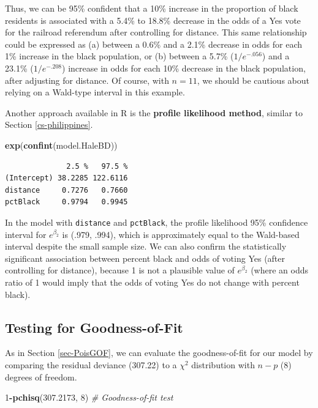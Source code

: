 \documentclass[
]{krantz}
\newenvironment{Shaded}{\begin{snugshade}}{\end{snugshade}}
\newcommand{\CommentTok}[1]{\textcolor[rgb]{0.37,0.37,0.37}{\textit{#1}}}
\newcommand{\DecValTok}[1]{\textcolor[rgb]{0.06,0.06,0.06}{#1}}
\newcommand{\FloatTok}[1]{\textcolor[rgb]{0.06,0.06,0.06}{#1}}
\newcommand{\KeywordTok}[1]{\textcolor[rgb]{0.27,0.27,0.27}{\textbf{#1}}}
\newcommand{\NormalTok}[1]{#1}
\newcommand{\OperatorTok}[1]{\textcolor[rgb]{0.43,0.43,0.43}{\textbf{#1}}}
\begin{document}
Thus, we can be 95\% confident that a 10\% increase in the proportion of black residents is associated with a 5.4\% to 18.8\% decrease in the odds of a Yes vote for the railroad referendum after controlling for distance. This same relationship could be expressed as (a) between a 0.6\% and a 2.1\% decrease in odds for each 1\% increase in the black population, or (b) between a 5.7\% (\(1/e^{-.056}\)) and a 23.1\% (\(1/e^{-.208}\)) increase in odds for each 10\% decrease in the black population, after adjusting for distance. Of course, with \(n=11\), we should be cautious about relying on a Wald-type interval in this example.

Another approach available in R is the \textbf{profile likelihood method},  similar to Section \ref{cs-philippines}.

\begin{Shaded}
\begin{Highlighting}[]
\KeywordTok{exp}\NormalTok{(}\KeywordTok{confint}\NormalTok{(model.HaleBD))}
\end{Highlighting}
\end{Shaded}

\begin{verbatim}
              2.5 %   97.5 %
(Intercept) 38.2285 122.6116
distance     0.7276   0.7660
pctBlack     0.9794   0.9945
\end{verbatim}

In the model with \texttt{distance} and \texttt{pctBlack}, the profile likelihood 95\% confidence interval for \(e^{\beta_2}\) is (.979, .994), which is approximately equal to the Wald-based interval despite the small sample size. We can also confirm the statistically significant association between percent black and odds of voting Yes (after controlling for distance), because 1 is not a plausible value of \(e^{\beta_2}\) (where an odds ratio of 1 would imply that the odds of voting Yes do not change with percent black).

\hypertarget{testing-for-goodness-of-fit}{%
\subsection{Testing for Goodness-of-Fit}\label{testing-for-goodness-of-fit}}

As in Section \ref{sec-PoisGOF}, we can evaluate the goodness-of-fit for our model by comparing the residual deviance (307.22) to a \(\chi^2\) distribution with \(n-p\) (8) degrees of freedom.

\begin{Shaded}
\begin{Highlighting}[]
\DecValTok{1}\OperatorTok{-}\KeywordTok{pchisq}\NormalTok{(}\FloatTok{307.2173}\NormalTok{, }\DecValTok{8}\NormalTok{)  }\CommentTok{# Goodness-of-fit test}
\end{Highlighting}
\end{Shaded}
\end{document}
